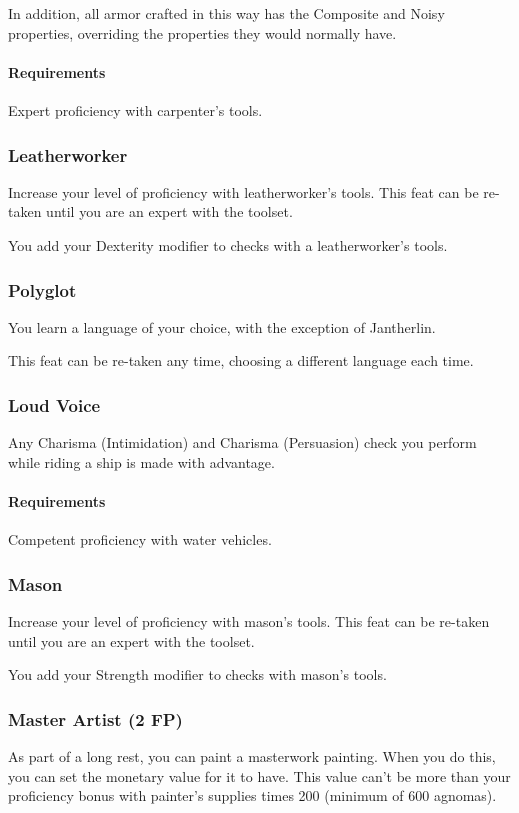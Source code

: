     In addition, all armor crafted in this way has the Composite and Noisy properties, overriding the properties they would normally have.
    \paragraph{Requirements} Expert proficiency with carpenter's tools.
\subsubsection{Leatherworker} \label{feat::leatherworker}
    Increase your level of proficiency with leatherworker's tools.
    This feat can be re-taken until you are an expert with the toolset.

    You add your Dexterity modifier to checks with a leatherworker's tools.
\subsubsection{Polyglot} \label{feat::polyglot}
    You learn a language of your choice, with the exception of Jantherlin.

    This feat can be re-taken any time, choosing a different language each time.
\subsubsection{Loud Voice} \label{feat::loudvoice}
    Any Charisma (Intimidation) and Charisma (Persuasion) check you perform while riding a ship is made with advantage.
    \paragraph{Requirements} Competent proficiency with water vehicles.
\subsubsection{Mason} \label{feat::mason}
    Increase your level of proficiency with mason's tools.
    This feat can be re-taken until you are an expert with the toolset.

    You add your Strength modifier to checks with mason's tools.
\subsubsection{Master Artist (2 FP)} \label{feat::masterartist}
    As part of a long rest, you can paint a masterwork painting.
    When you do this, you can set the monetary value for it to have.
    This value can't be more than your proficiency bonus with painter's supplies times 200 (minimum of 600 agnomas).
